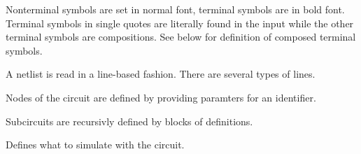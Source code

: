 Nonterminal symbols are set in normal font, terminal symbols are in
bold font. Terminal symbols in single quotes are literally found in
the input while the other terminal symbols are compositions. See below
for definition of composed terminal symbols.


%
%
\begin{grammar}


\end{grammar}

A netlist is read in a line-based fashion. There are several types of
lines.


%
\begin{grammar}

\end{grammar}

Nodes of the circuit are defined by providing paramters for an
identifier.

%
\begin{grammar}




\end{grammar}

Subcircuits are recursivly defined by blocks of definitions.

%
\begin{grammar}

\end{grammar}

Defines what to simulate with the circuit.

%
\begin{grammar}

\end{grammar}


